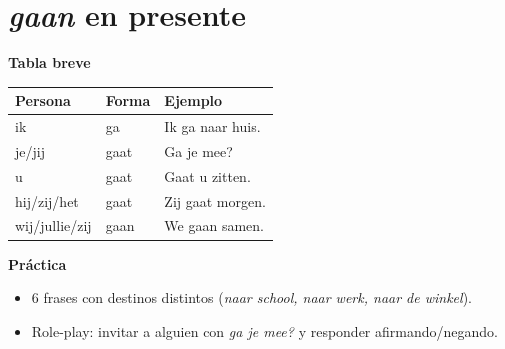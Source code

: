 \section{\textit{gaan} en presente}
\textbf{Tabla breve}
\begin{center}
\begin{tabular}{lll}
\toprule
Persona & Forma & Ejemplo \\
\midrule
ik & ga & Ik ga naar huis. \\
je/jij & gaat & Ga je mee? \\
u & gaat & Gaat u zitten. \\
hij/zij/het & gaat & Zij gaat morgen. \\
wij/jullie/zij & gaan & We gaan samen. \\
\bottomrule
\end{tabular}
\end{center}

\textbf{Práctica}
\begin{itemize}[leftmargin=*]
  \item 6 frases con destinos distintos (\textit{naar school, naar werk, naar de winkel}).
  \item Role-play: invitar a alguien con \textit{ga je mee?} y responder afirmando/negando.
\end{itemize}
